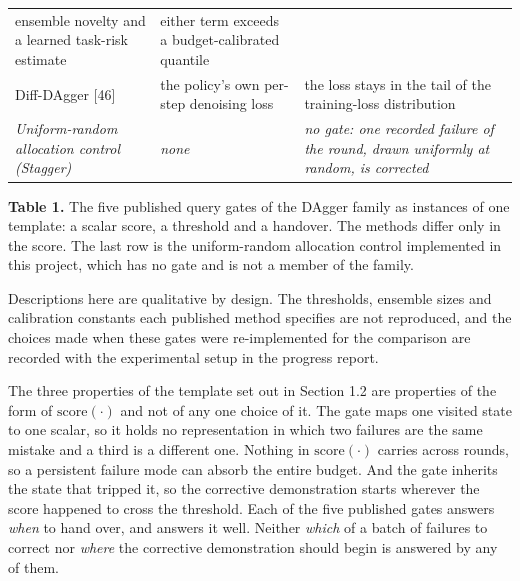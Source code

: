 \documentclass[
  11pt,
]{article}
\begin{document}
\begin{longtable}[]{@{}lll@{}}
\begin{minipage}[t]{0.30\columnwidth}
ensemble novelty and a learned task-risk estimate\strut
\end{minipage} & \begin{minipage}[t]{0.30\columnwidth}\raggedright
either term exceeds a budget-calibrated quantile\strut
\end{minipage}\tabularnewline
\begin{minipage}[t]{0.30\columnwidth}\raggedright
Diff-DAgger {[}46{]}\strut
\end{minipage} & \begin{minipage}[t]{0.30\columnwidth}\raggedright
the policy's own per-step denoising loss\strut
\end{minipage} & \begin{minipage}[t]{0.30\columnwidth}\raggedright
the loss stays in the tail of the training-loss distribution\strut
\end{minipage}\tabularnewline
\begin{minipage}[t]{0.30\columnwidth}\raggedright
\emph{Uniform-random allocation control (Stagger)}\strut
\end{minipage} & \begin{minipage}[t]{0.30\columnwidth}\raggedright
\emph{none}\strut
\end{minipage} & \begin{minipage}[t]{0.30\columnwidth}\raggedright
\emph{no gate: one recorded failure of the round, drawn uniformly at
random, is corrected}\strut
\end{minipage}\tabularnewline
\bottomrule
\end{longtable}

\textbf{Table 1.} The five published query gates of the DAgger family as
instances of one template: a scalar score, a threshold and a handover.
The methods differ only in the score. The last row is the uniform-random
allocation control implemented in this project, which has no gate and is
not a member of the family.

Descriptions here are qualitative by design. The thresholds, ensemble
sizes and calibration constants each published method specifies are not
reproduced, and the choices made when these gates were re-implemented
for the comparison are recorded with the experimental setup in the
progress report.

The three properties of the template set out in Section 1.2 are
properties of the form of \(\mathrm{score}(\cdot)\) and not of any one
choice of it. The gate maps one visited state to one scalar, so it holds
no representation in which two failures are the same mistake and a third
is a different one. Nothing in \(\mathrm{score}(\cdot)\) carries across
rounds, so a persistent failure mode can absorb the entire budget. And
the gate inherits the state that tripped it, so the corrective
demonstration starts wherever the score happened to cross the threshold.
Each of the five published gates answers \emph{when} to hand over, and
answers it well. Neither \emph{which} of a batch of failures to correct
nor \emph{where} the corrective demonstration should begin is answered
by any of them.
\end{document}
